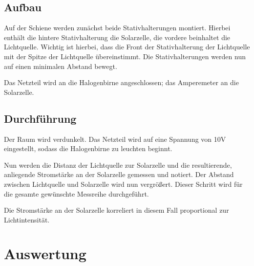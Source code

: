 \documentclass[12pt, a4paper]{article}
\begin{document}
\subsection{Aufbau}
Auf der Schiene werden zunächst beide Stativhalterungen montiert.
Hierbei enthält die hintere Stativhalterung die Solarzelle, die vordere beinhaltet die Lichtquelle.
Wichtig ist hierbei, dass die Front der Stativhalterung der Lichtquelle mit der Spitze der Lichtquelle übereinstimmt.
Die Stativhalterungen werden nun auf einen minimalen Abstand bewegt.

Das Netzteil wird an die Halogenbirne angeschlossen; das Amperemeter an die Solarzelle.

\subsection{Durchführung}
Der Raum wird verdunkelt.
Das Netzteil wird auf eine Spannung von 10V eingestellt, sodass die Halogenbirne zu leuchten beginnt.

Nun werden die Distanz der Lichtquelle zur Solarzelle und die resultierende, anliegende Stromstärke an der Solarzelle gemessen und notiert.
Der Abstand zwischen Lichtquelle und Solarzelle wird nun vergrößert. Dieser Schritt wird für die gesamte gewünschte Messreihe durchgeführt.

Die Stromstärke an der Solarzelle korreliert in diesem Fall proportional zur Lichtintensität.

\section{Auswertung}
\end{document}

